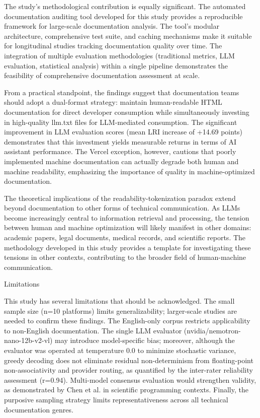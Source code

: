 \documentclass[10pt,conference,a4paper]{IEEEtran}
\makeatletter
\let\oldsubsection\subsection
\renewcommand{\subsection}{%
    \@ifstar{\subsectionStar}{\subsectionNoStar}%
}
\newcommand{\subsectionStar}[1]{%
    \oldsubsection*{\textit{#1}}%
    \vspace{-3pt}%
}
\newcommand{\subsectionNoStar}[1]{%
    \oldsubsection{\textit{#1}}%
    \vspace{-3pt}%
}
\makeatother
\begin{document}
The study's methodological contribution is equally significant. The automated documentation auditing tool developed for this study provides a reproducible framework for large-scale documentation analysis. The tool's modular architecture, comprehensive test suite, and caching mechanisms make it suitable for longitudinal studies tracking documentation quality over time. The integration of multiple evaluation methodologies (traditional metrics, LLM evaluation, statistical analysis) within a single pipeline demonstrates the feasibility of comprehensive documentation assessment at scale.

From a practical standpoint, the findings suggest that documentation teams should adopt a dual-format strategy: maintain human-readable HTML documentation for direct developer consumption while simultaneously investing in high-quality llm.txt files for LLM-mediated consumption. The significant improvement in LLM evaluation scores (mean LRI increase of +14.69 points) demonstrates that this investment yields measurable returns in terms of AI assistant performance. The Vercel exception, however, cautions that poorly implemented machine documentation can actually degrade both human and machine readability, emphasizing the importance of quality in machine-optimized documentation.

The theoretical implications of the readability-tokenization paradox extend beyond documentation to other forms of technical communication. As LLMs become increasingly central to information retrieval and processing, the tension between human and machine optimization will likely manifest in other domains: academic papers, legal documents, medical records, and scientific reports. The methodology developed in this study provides a template for investigating these tensions in other contexts, contributing to the broader field of human-machine communication.

\subsection{Limitations}

This study has several limitations that should be acknowledged. The small sample size (n=10 platforms) limits generalizability; larger-scale studies are needed to confirm these findings. The English-only corpus restricts applicability to non-English documentation. The single LLM evaluator (nvidia/nemotron-nano-12b-v2-vl) may introduce model-specific bias; moreover, although the evaluator was operated at temperature 0.0 to minimize stochastic variance, greedy decoding does not eliminate residual non-determinism from floating-point non-associativity and provider routing, as quantified by the inter-rater reliability assessment (r=0.94). Multi-model consensus evaluation would strengthen validity, as demonstrated by Chen et al. \cite{Chen2025} in scientific programming contexts. Finally, the purposive sampling strategy limits representativeness across all technical documentation genres.
\end{document}
